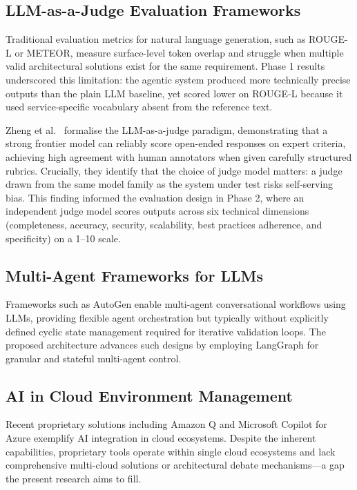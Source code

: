 \subsection{LLM-as-a-Judge Evaluation Frameworks}

Traditional evaluation metrics for natural language generation, such as ROUGE-L or METEOR, measure surface-level token overlap and struggle when multiple valid architectural solutions exist for the same requirement. Phase 1 results underscored this limitation: the agentic system produced more technically precise outputs than the plain LLM baseline, yet scored lower on ROUGE-L because it used service-specific vocabulary absent from the reference text.

Zheng et al.~\cite{zheng2024judging} formalise the LLM-as-a-judge paradigm, demonstrating that a strong frontier model can reliably score open-ended responses on expert criteria, achieving high agreement with human annotators when given carefully structured rubrics. Crucially, they identify that the choice of judge model matters: a judge drawn from the same model family as the system under test risks self-serving bias. This finding informed the evaluation design in Phase 2, where an independent judge model scores outputs across six technical dimensions (completeness, accuracy, security, scalability, best practices adherence, and specificity) on a 1--10 scale.

\subsection{Multi-Agent Frameworks for LLMs}

Frameworks such as AutoGen \cite{wu2023autogen} enable multi-agent conversational workflows using LLMs, providing flexible agent orchestration but typically without explicitly defined cyclic state management required for iterative validation loops. The proposed architecture advances such designs by employing LangGraph \cite{langgraph2024docs} for granular and stateful multi-agent control.

\subsection{AI in Cloud Environment Management}

Recent proprietary solutions including Amazon Q \cite{aws2023q} and Microsoft Copilot for Azure \cite{microsoft2024copilot} exemplify AI integration in cloud ecosystems. Despite the inherent capabilities, proprietary tools operate within single cloud ecosystems and lack comprehensive multi-cloud solutions or architectural debate mechanisms—a gap the present research aims to fill.

